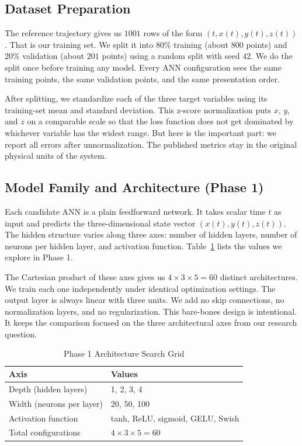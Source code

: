 \subsection{Dataset Preparation}

The reference trajectory gives us $1001$ rows of the form $(t, x(t), y(t), z(t))$. That is our training set. We split it into 80\% training (about $800$ points) and 20\% validation (about $201$ points) using a random split with seed $42$. We do the split once before training any model. Every ANN configuration sees the same training points, the same validation points, and the same presentation order.

After splitting, we standardize each of the three target variables using its training-set mean and standard deviation. This z-score normalization puts $x$, $y$, and $z$ on a comparable scale so that the loss function does not get dominated by whichever variable has the widest range. But here is the important part: we report all errors after unnormalization. The published metrics stay in the original physical units of the system.

\subsection{Model Family and Architecture (Phase 1)}

Each candidate ANN is a plain feedforward network. It takes scalar time $t$ as input and predicts the three-dimensional state vector $(x(t), y(t), z(t))$. The hidden structure varies along three axes: number of hidden layers, number of neurons per hidden layer, and activation function. Table~\ref{tab:phase1grid} lists the values we explore in Phase 1.

The Cartesian product of these axes gives us $4 \times 3 \times 5 = 60$ distinct architectures. We train each one independently under identical optimization settings. The output layer is always linear with three units. We add no skip connections, no normalization layers, and no regularization. This bare-bones design is intentional. It keeps the comparison focused on the three architectural axes from our research question.

\begin{table}[H]
\centering
\caption{Phase 1 Architecture Search Grid}
\label{tab:phase1grid}
\renewcommand{\arraystretch}{1.2}
\begin{tabular}{|l|l|}
\hline
\textbf{Axis} & \textbf{Values} \\
\hline
Depth (hidden layers) & 1, 2, 3, 4 \\
\hline
Width (neurons per layer) & 20, 50, 100 \\
\hline
Activation function & tanh, ReLU, sigmoid, GELU, Swish \\
\hline
Total configurations & $4 \times 3 \times 5 = 60$ \\
\hline
\end{tabular}
\end{table}

